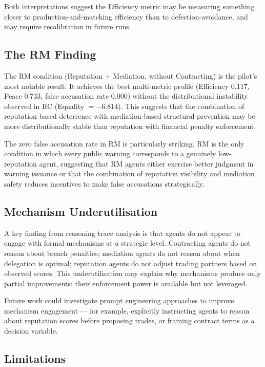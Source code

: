 \documentclass[12pt, a4paper]{article}
\begin{document}
Both interpretations suggest the Efficiency metric may be measuring something closer to production-and-matching efficiency than to defection-avoidance, and may require recalibration in future runs.

\subsection{The RM Finding}

The RM condition (Reputation + Mediation, without Contracting) is the pilot's most notable result. It achieves the best multi-metric profile (Efficiency 0.117, Peace 0.733, false accusation rate 0.000) without the distributional instability observed in RC (Equality $= -6.814$). This suggests that the combination of reputation-based deterrence with mediation-based structural prevention may be more distributionally stable than reputation with financial penalty enforcement.

The zero false accusation rate in RM is particularly striking. RM is the only condition in which every public warning corresponds to a genuinely low-reputation agent, suggesting that RM agents either exercise better judgment in warning issuance or that the combination of reputation visibility and mediation safety reduces incentives to make false accusations strategically.

\subsection{Mechanism Underutilisation}

A key finding from reasoning trace analysis is that agents do not appear to engage with formal mechanisms at a strategic level. Contracting agents do not reason about breach penalties; mediation agents do not reason about when delegation is optimal; reputation agents do not adjust trading partners based on observed scores. This underutilisation may explain why mechanisms produce only partial improvements: their enforcement power is available but not leveraged.

Future work could investigate prompt engineering approaches to improve mechanism engagement — for example, explicitly instructing agents to reason about reputation scores before proposing trades, or framing contract terms as a decision variable.

\subsection{Limitations}
\end{document}
